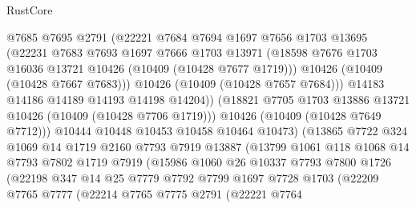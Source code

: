 \begin{lexlean}{RustCore}
\begin{coremodule}
                        @7685
                        @7695
                        @2791
                        (@22221
                          @7684
                          @7694
                          @1697
                          @7656
                          @1703
                          @13695
                          (@22231
                            @7683
                            @7693
                            @1697
                            @7666
                            @1703
                            @13971
                            (@18598 @7676 @1703 @16036 @13721 @10426 (@10409 (@10428 @7677 @1719)))
                            @10426
                            (@10409 (@10428 @7667 @7683)))
                          @10426
                          (@10409 (@10428 @7657 @7684)))
                        @14183
                        @14186
                        @14189
                        @14193
                        @14198
                        @14204))
                    (@18821 @7705 @1703 @13886 @13721 @10426 (@10409 (@10428 @7706 @1719)))
                    @10426
                    (@10409 (@10428 @7649 @7712)))
                  @10444
                  @10448
                  @10453
                  @10458
                  @10464
                  @10473)
                (@13865
                  @7722
                  @324
                  @1069
                  @14
                  @1719
                  @2160
                  @7793
                  @7919
                  @13887
                  (@13799
                    @1061
                    @118
                    @1068
                    @14
                    @7793
                    @7802
                    @1719
                    @7919
                    (@15986
                      @1060
                      @26
                      @10337
                      @7793
                      @7800
                      @1726
                      (@22198
                        @347
                        @14
                        @25
                        @7779
                        @7792
                        @7799
                        @1697
                        @7728
                        @1703
                        (@22209
                          @7765
                          @7777
                          (@22214
                            @7765
                            @7775
                            @2791
                            (@22221
                              @7764

\end{coremodule}
\end{lexlean}
